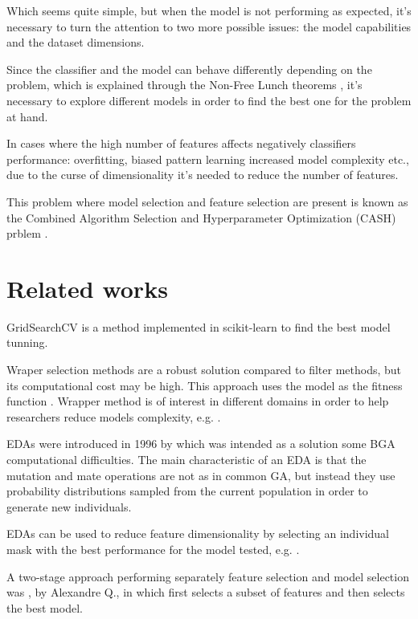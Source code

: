 \documentclass[10pt]{IEEEtran}
\begin{document}
Which seems quite simple, but when the model is not performing as expected, it's necessary to
turn the attention to two more possible issues: the model capabilities and the dataset dimensions.

Since the classifier and the model can behave differently depending on the problem, which
is explained through the Non-Free Lunch theorems \cite{NoFreeLunch6795940}, it's necessary to
explore different models in order to find the best one for the problem at hand.

In cases where the high number of features affects negatively classifiers performance:
overfitting, biased pattern learning increased model complexity etc., due to the curse of
dimensionality \cite{9780691652214_Richard-E.-Bellman} it's needed to reduce the number of
features.

This problem where model selection and feature selection are present is known as the
Combined Algorithm Selection and Hyperparameter Optimization (CASH) prblem \cite{AutoMLBook-CASH2019}. 

\section{ Related works }
GridSearchCV is a method implemented in scikit-learn \cite{sklearn_10.5555/1953048.2078195}
to find the best model tunning.

Wraper selection methods are a robust solution compared to filter methods, but its computational cost
may be high. This approach uses the model as the fitness function \cite{RobFeatSelSaeys2008, KOHAVI1997273}.
Wrapper method is of interest in different domains in order to help researchers reduce
models complexity, e.g. \cite{Panthong2015, WrappedBased-RapidImage5256251, Choi2011}.

EDAs were introduced in 1996 by \cite{Mhlenbein1996} which was intended as a solution some
BGA computational difficulties. The main characteristic of an EDA is that the mutation and 
mate operations are not as in common GA, but instead they use probability distributions
sampled from the current population in order to generate new individuals\cite{EDAsPL2002}.

EDAs can be used to reduce feature dimensionality by selecting an individual mask with
the best performance for the model tested, e.g. \cite{10.5555/2955491.2955545}.

A two-stage approach performing separately feature selection and model selection was
\cite{QUEMY2020101483}, by Alexandre Q., in which first selects a subset of features
and then selects the best model.
\end{document}
